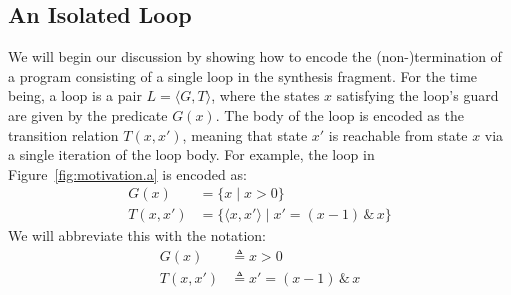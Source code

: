 \documentclass[preprint]{sigplanconf}
\theoremstyle{definition}
\begin{document}
\subsection{An Isolated Loop}

We will begin our discussion by showing how to encode the
\mbox{(non-)termination} of a program consisting of a single loop in the
synthesis fragment.  For the time being, a loop is a pair ${L= \langle G,T
\rangle}$, where the states $x$ satisfying the loop's guard are given by the
predicate $G(x)$.  The body of the loop is encoded as the transition
relation $T(x, x')$, meaning that state $x'$ is reachable from state $x$ via
a single iteration of the loop body.  For example, the loop in
Figure~\ref{fig:motivation.a} is encoded as:
%
\begin{align*}
G(x) & = \{ x \mid x>0 \} \\
T(x,x') &= \{ \langle x, x' \rangle \mid x' = (x - 1) \, \& \, x \}
\end{align*}
We will abbreviate this with the notation:
\begin{align*}
G(x) & \triangleq x > 0 \\
T(x, x') & \triangleq x' = (x - 1) \, \& \, x
\end{align*}
\end{document}
